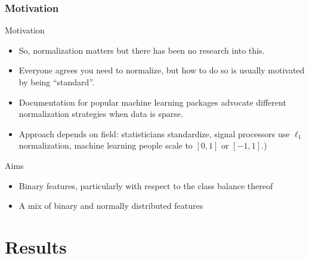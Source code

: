 \documentclass[aspectratio=1610,onlytextwidth]{beamer}
\begin{document}
\begin{frame}[c]
  \frametitle{Motivation}

  \begin{block}{Motivation}
    \begin{itemize}[<+->]
      \item So, normalization matters but there has been no research into this.
      \item Everyone agrees you need to normalize, but how to do so is usually motivated by being
            ``standard''.
      \item Documentation for popular machine learning packages advocate different normalization
            strategies when data is sparse.
      \item Approach depends on field: statisticians standardize, signal processors use $\ell_1$
            normalization, machine learning people scale to $[0, 1]$ or $[-1, 1]$.)
    \end{itemize}
  \end{block}

  \pause

  \begin{block}{Aims}
    \begin{itemize}[<+->]
      \item Binary features, particularly with respect to the \alert{class balance} thereof
      \item A mix of binary and normally distributed features
    \end{itemize}
  \end{block}

\end{frame}

\section{Results}
\end{document}
